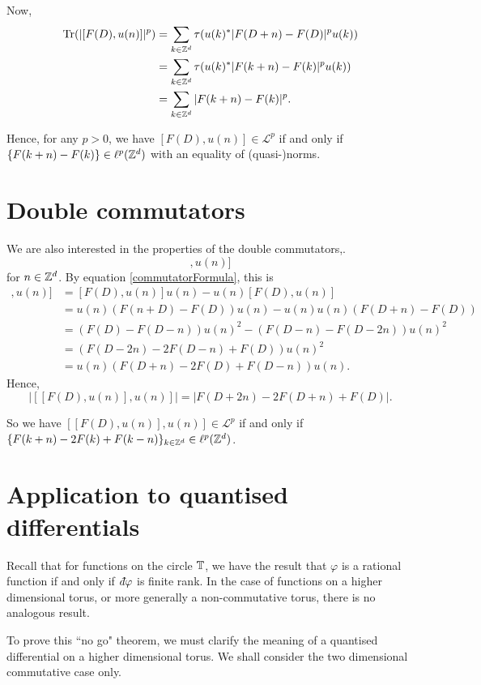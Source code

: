 Now,
\begin{align}
    \operatorname{Tr}(|[F(D),u(n)]|^p) &= \sum_{k \in \mathbb{Z}^d} \tau(u(k)^*|F(D+n)-F(D)|^pu(k))\\
    &= \sum_{k \in \mathbb{Z}^d} \tau(u(k)^*|F(k+n)-F(k)|^pu(k))\\
    &= \sum_{k \in \mathbb{Z}^d} |F(k+n)-F(k)|^p.
\end{align}

Hence, for any $p > 0$, we have $[F(D),u(n)] \in \mathcal{L}^p$ if and only if
$\{F(k+n)-F(k)\} \in \ell^p(\mathbb{Z}^d)$ with an equality of (quasi-)norms.


\section{Double commutators}

We are also interested in the properties of the double commutators,.
\begin{equation*}
    [[F(D),u(n)],u(n)]
\end{equation*}
for $n \in \mathbb{Z}^d$. By equation \ref{commutatorFormula}, this is
\begin{align}
    [[F(D),u(n)],u(n)] &= [F(D),u(n)]u(n) - u(n)[F(D),u(n)] \\
                       &= u(n)(F(n+D)-F(D))u(n)-u(n)u(n)(F(D+n)-F(D))\\
                       &= (F(D)-F(D-n))u(n)^2-(F(D-n)-F(D-2n))u(n)^2\\
                       &= (F(D-2n)-2F(D-n)+F(D))u(n)^2\\
                       &= u(n)(F(D+n)-2F(D)+F(D-n))u(n).
\end{align}
Hence,
\begin{equation*}
    |[[F(D),u(n)],u(n)]| = |F(D+2n)-2F(D+n)+F(D)|.
\end{equation*}

So we have $[[F(D),u(n)],u(n)] \in \mathcal{L}^p$
if and only if $\{F(k+n)-2F(k)+F(k-n)\}_{k\in \mathbb{Z}^d} \in \ell^p(\mathbb{Z}^d)$.

\section{Application to quantised differentials}
Recall that for functions on the circle $\mathbb{T}$, we have the result
that $\varphi$ is a rational function if and only if $\qd \varphi$
is finite rank. In the case of functions on a higher dimensional
torus, or more generally a non-commutative torus, there is no analogous
result.

To prove this ``no go" theorem, we must clarify the meaning of a quantised differential
on a higher dimensional torus. We shall consider the two dimensional commutative case only.
\begin{definition}
    
\end{definition}


